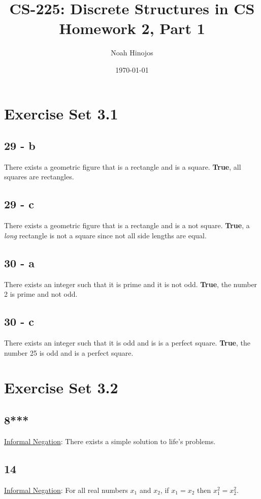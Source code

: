 \documentclass[12pt]{article}
\title{
  \textbf{CS-225: Discrete Structures in CS} \\
  Homework 2, Part 1
  }
\author{Noah Hinojos}
\date{\today}
\begin{document}
\maketitle

\section*{Exercise Set 3.1}

\subsection*{29 - b}
There exists a geometric figure that is a rectangle and is a square. 
\textbf{True}, all squares are rectangles.

\subsection*{29 - c}
There exists a geometric figure that is a rectangle and is a not square.
\textbf{True}, a \textit{long} rectangle is not a square since not all side lengths are equal.

\subsection*{30 - a}
There exists an integer such that it is prime and it is not odd.
\textbf{True}, the number 2 is prime and not odd.

\subsection*{30 - c}
There exists an integer such that it is odd and is is a perfect square.
\textbf{True}, the number 25 is odd and is a perfect square.

\section*{Exercise Set 3.2}

\subsection*{8***}
\underline{Informal Negation}: There exists a simple solution to life's problems.

\subsection*{14}
\underline{Informal Negation}: For all real numbers $x_1$ and $x_2$, if $x_1=x_2$ then $x_1^2 = x_2^2$.
\end{document}
